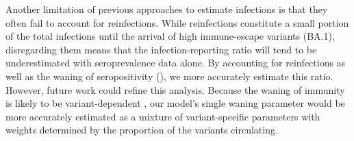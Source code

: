 Another limitation of previous approaches to estimate infections is that they
often fail to account for reinfections. While reinfections constitute a small
portion of the total infections until the arrival of high immune-escape variants
(BA.1), disregarding them means that the infection-reporting ratio will tend to
be underestimated with seroprevalence data alone. By accounting for reinfections
as well as the waning of seropositivity (), we more
accurately estimate this ratio. However, future work could refine this analysis.
Because the waning of immunity is likely to be variant-dependent
\citep{pooley2023durability}, our model's single waning parameter would be more
accurately estimated as a mixture of variant-specific parameters with weights
determined by the proportion of the variants circulating. 

